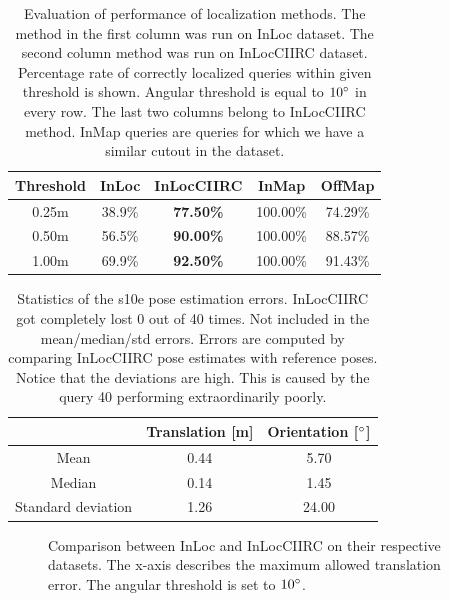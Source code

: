 \documentclass[twoside]{ctuthesis}
\theoremstyle{plain}
\theoremstyle{definition}
\theoremstyle{note}
\begin{document}
\begin{table}[htb!]
	\centering
	\begin{tabular}{|c|c||c|c|c|}
		\hline
		Threshold & InLoc & \bfseries InLocCIIRC & InMap & OffMap \\
		\hline
		0.25m & 38.9\% & \bfseries 77.50\% & 100.00\% & 74.29\% \\
		0.50m & 56.5\% & \bfseries 90.00\% & 100.00\% & 88.57\% \\
		1.00m & 69.9\% & \bfseries 92.50\% & 100.00\% & 91.43\% \\
		\hline
	\end{tabular}
	\caption{Evaluation of performance of localization methods. The method in the first column was run on InLoc dataset. The second column method was run on InLocCIIRC dataset. Percentage rate of correctly localized queries within given threshold is shown. Angular threshold is equal to $10\degree$ in every row. The last two columns belong to InLocCIIRC method. InMap queries are queries for which we have a similar cutout in the dataset.}
	\label{tab:s10e-InLoc-statistics}
\end{table}

\begin{table}[htb!]
	\centering
	\begin{tabular}{|c|c|c|}
		\hline
		\diagbox{\small Statistics}{\small Error type} & Translation [m] & Orientation [$\degree$] \\
		\hline
		Mean & 0.44 & 5.70 \\
		\hline
		Median & 0.14 & 1.45 \\
		\hline
		Standard deviation & 1.26 & 24.00 \\
		\hline
	\end{tabular}
	\caption{Statistics of the s10e pose estimation errors. InLocCIIRC got completely lost 0 out of 40 times. Not included in the mean/median/std errors. Errors are computed by comparing InLocCIIRC pose estimates with reference poses. Notice that the deviations are high. This is caused by the query 40 performing extraordinarily poorly.}
	\label{tab:s10e-other-statistics}
\end{table}

\begin{figure}[htb!]
	\centering
	
	\caption{Comparison between InLoc and InLocCIIRC on their respective datasets. The x-axis describes the maximum allowed translation error. The angular threshold is set to $10\degree$.}
	\label{fig:dist-thresh-vs-accuracy}
\end{figure}
\end{document}
